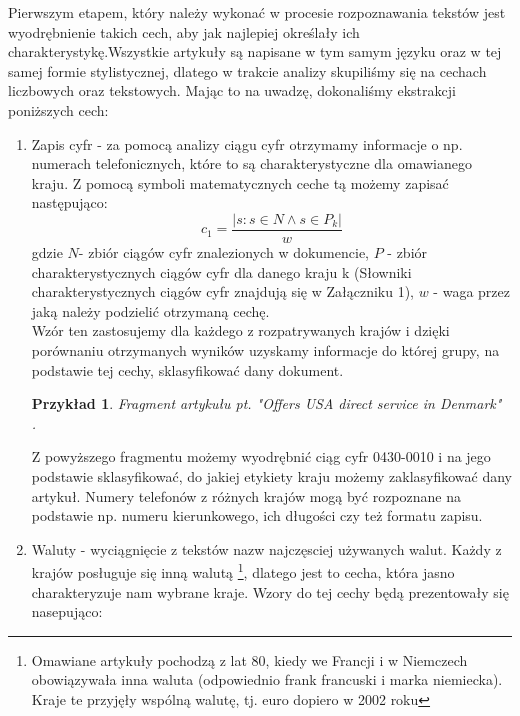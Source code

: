 \documentclass{classrep}
\newtheorem{exmp}{Przykład}[section]
\begin{document}
Pierwszym etapem, który należy wykonać w procesie rozpoznawania tekstów jest wyodrębnienie takich cech, 
aby jak najlepiej określały ich charakterystykę.Wszystkie artykuły są napisane w tym samym języku oraz w tej samej formie stylistycznej, 
dlatego w trakcie analizy skupiliśmy się na cechach liczbowych oraz tekstowych. Mając to na uwadzę, dokonaliśmy ekstrakcji poniższych cech:
\begin{enumerate}
    \item Zapis cyfr - za pomocą analizy ciągu cyfr otrzymamy informacje o np. numerach telefonicznych, które to są charakterystyczne dla omawianego kraju. Z pomocą symboli matematycznych ceche tą możemy zapisać następująco:  
    \begin{equation}
        c_1 = \frac{|{s: s \in N \land s \in P_k}|}{w}
    \end{equation}
    gdzie $N$- zbiór ciągów cyfr znalezionych w dokumencie, $P$ - zbiór charakterystycznych ciągów cyfr dla danego kraju k (Słowniki charakterystycznych ciągów cyfr znajdują się w Załączniku 1), $w$ - waga przez jaką należy podzielić otrzymaną cechę.\\
    Wzór ten zastosujemy dla każdego z rozpatrywanych krajów i dzięki porównaniu otrzymanych wyników uzyskamy informacje do której grupy, na podstawie tej cechy, sklasyfikować dany dokument. \\
    \begin{exmp}Fragment artykułu pt. "Offers USA direct service in Denmark" \cite{reuters}\\
    . \\
    \end{exmp}
Z powyższego fragmentu możemy wyodrębnić ciąg cyfr 0430-0010 i na jego podstawie sklasyfikować, do jakiej etykiety kraju możemy zaklasyfikować dany artykuł. Numery telefonów z różnych krajów mogą być rozpoznane na podstawie np. numeru kierunkowego, ich długości czy też formatu zapisu. \\
    \item Waluty - wyciągnięcie z tekstów nazw najczęsciej używanych walut. Każdy z krajów posługuje się inną walutą \footnote{Omawiane artykuły pochodzą z lat 80, kiedy we Francji i w Niemczech obowiązywała inna waluta (odpowiednio frank francuski i marka niemiecka). Kraje te przyjęły wspólną walutę, tj. euro dopiero w 2002 roku}, dlatego jest to cecha, która jasno charakteryzuje nam wybrane kraje. Wzory do tej cechy będą prezentowały się nasepująco:

\end{enumerate}
\end{document}
